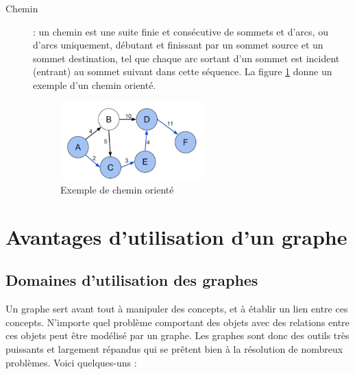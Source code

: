\begin{description}
\item[Chemin] : un chemin est une suite finie et consécutive de sommets et d'arcs, ou d'arcs uniquement, débutant et finissant par un sommet source et un sommet destination, tel que chaque arc sortant d'un sommet est incident (entrant) au sommet suivant dans cette séquence.
La figure \ref{fig:chemin} donne un exemple d'un chemin orienté.
\begin{figure}[h]
	\centering
	\includegraphics[width=0.55\textwidth]{img/cheminGraphe.png}
	\caption{Exemple de chemin orienté}
	\label{fig:chemin}
\end{figure}
\end{description}

	
	
\section{Avantages d'utilisation d'un graphe}
\subsection{Domaines d'utilisation des graphes}
Un graphe sert avant tout à manipuler des concepts, et à établir un lien entre ces concepts. N'importe quel problème comportant des objets avec des relations entre ces objets peut être modélisé par un graphe.
Les graphes sont donc des outils très puissants et largement répandus qui se prêtent bien à la résolution de nombreux problèmes. Voici quelques-uns :

